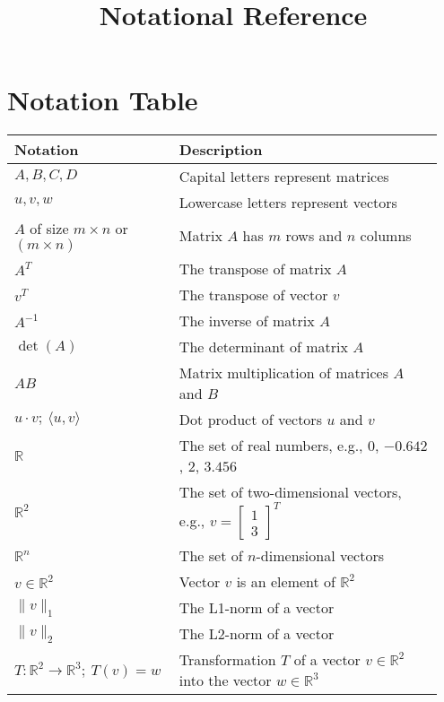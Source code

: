 \documentclass[12pt]{article}
\title{Notational Reference}
\begin{document}
\section*{Notation Table}

\begin{center}
\renewcommand{\arraystretch}{1.5}
\begin{tabular}{|p{0.35\linewidth}|p{0.6\linewidth}|}
\hline
\textbf{Notation} & \textbf{Description} \\
\hline
$A, B, C, D$ & Capital letters represent matrices \\
\hline
$u, v, w$ & Lowercase letters represent vectors \\
\hline
$A$ of size $m \times n$ or $(m \times n)$ & Matrix $A$ has $m$ rows and $n$ columns \\
\hline
$A^T$ & The transpose of matrix $A$ \\
\hline
$v^T$ & The transpose of vector $v$ \\
\hline
$A^{-1}$ & The inverse of matrix $A$ \\
\hline
$\det(A)$ & The determinant of matrix $A$ \\
\hline
$AB$ & Matrix multiplication of matrices $A$ and $B$ \\
\hline
$u \cdot v;\ \langle u, v \rangle$ & Dot product of vectors $u$ and $v$ \\
\hline
$\mathbb{R}$ & The set of real numbers, e.g., $0$, $-0.642$, $2$, $3.456$ \\
\hline
$\mathbb{R}^2$ & The set of two-dimensional vectors, e.g., $v = \begin{bmatrix} 1 \\ 3 \end{bmatrix}^{T}$ \\
\hline
$\mathbb{R}^n$ & The set of $n$-dimensional vectors \\
\hline
$v \in \mathbb{R}^2$ & Vector $v$ is an element of $\mathbb{R}^2$ \\
\hline
$\|v\|_1$ & The L1-norm of a vector \\
\hline
$\|v\|_2$ & The L2-norm of a vector \\
\hline
$T : \mathbb{R}^2 \to \mathbb{R}^3;\ T(v) = w$ & Transformation $T$ of a vector $v \in \mathbb{R}^2$ into the vector $w \in \mathbb{R}^3$ \\
\hline
\end{tabular}
\end{center}
\end{document}
